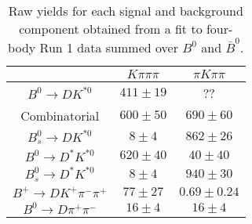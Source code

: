 \begin{table}
  \centering
  \begin{tabular}{ccc}
      \toprule
       & $K\pi\pi\pi$ & $\pi K\pi\pi$ \\
      \midrule
      $B^0 \to DK^{*0}$ & $411 \pm 19$ & ?? \\
      Combinatorial & $600 \pm 50$ & $690 \pm 60$ \\
      $B^0_s \to DK^{*0}$ & $8 \pm 4$ & $862 \pm 26$ \\
      $B^0 \to D^*K^{*0}$ & $620 \pm 40$ & $40 \pm 40$ \\
      $B^0_s \to D^*K^{*0}$ & $8 \pm 4$ & $940 \pm 30$ \\
      $B^+ \to DK^+\pi^-\pi^+$ & $77 \pm 27$ & $0.69 \pm 0.24$ \\
      $B^0 \to D\pi^+\pi^-$ & $16 \pm 4$ & $16 \pm 4$ \\
      \bottomrule
      \end{tabular}
  \caption{Raw yields for each signal and background component obtained from a fit to four-body Run 1 data summed over $B^0$ and $\bar{B}^0$.}
\label{tab:yields_combined_4body_run1}
\end{table}
